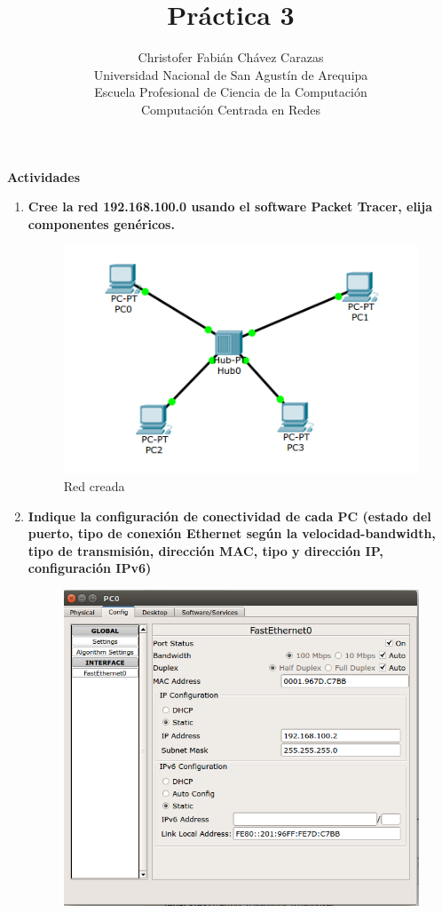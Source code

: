 \documentclass[a4paper,12pt]{article}
\begin{document}
\title{Práctica 3}
\author{
Christofer Fabián Chávez Carazas \\
\small{Universidad Nacional de San Agustín de Arequipa} \\
\small{Escuela Profesional de Ciencia de la Computación} \\
\small{Computación Centrada en Redes}
}
\date{}

\maketitle

\begin{large}
 \textbf{Actividades}
\end{large}

\begin{enumerate}
 \item \textbf{Cree la red 192.168.100.0 usando el software Packet Tracer, elija componentes genéricos.}
 \begin{figure}[H]
  \centering
  \includegraphics[scale = 0.5]{1.png}
  \caption{Red creada}
 \end{figure}
 \item \textbf{Indique la configuración de conectividad de cada PC (estado del puerto, tipo de conexión Ethernet según la velocidad-bandwidth, tipo de transmisión, dirección MAC, tipo y dirección IP, configuración IPv6)}
 \begin{figure}[H]
  \centering
  \includegraphics[scale = 0.5]{2.png}

\end{figure}
\end{enumerate}
\end{document}

